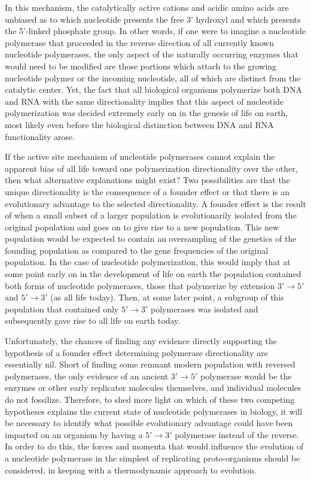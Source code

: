 In this mechanism, the catalytically active cations and acidic amino acids are unbiased as to which nucleotide presents the free 3' hydroxyl and which presents the 5'-linked phosphate group. In other words, if one were to imagine a nucleotide polymerase that proceeded in the reverse direction of all currently known nucleotide polymerases, the only aspect of the naturally occurring enzymes that would need to be modified are those portions which attach to the growing nucleotide polymer or the incoming nucleotide, all of which are distinct from the catalytic center. Yet, the fact that all biological organisms polymerize both DNA and RNA with the same directionality implies that this aspect of nucleotide polymerization was decided extremely early on in the genesis of life on earth, most likely even before the biological distinction between DNA and RNA functionality arose.

If the active site mechanism of nucleotide polymerases cannot explain the apparent bias of all life toward one polymerization directionality over the other, then what alternative explanations might exist? Two possibilities are that the unique directionality is the consequence of a founder effect or that there is an evolutionary advantage to the selected directionality. A founder effect is the result of when a small subset of a larger population is evolutionarily isolated from the original population and goes on to give rise to a new population. This new population would be expected to contain an oversampling of the genetics of the founding population as compared to the gene frequencies of the original population. In the case of nucleotide polymerization, this would imply that at some point early on in the development of life on earth the population contained both forms of nucleotide polymerases, those that polymerize by extension $3'\to5'$ and $5'\to3'$ (as all life today). Then, at some later point, a subgroup of this population that contained only $5'\to3'$ polymerases was isolated and subsequently gave rise to all life on earth today.

Unfortunately, the chances of finding any evidence directly supporting the hypothesis of a founder effect determining polymerase directionality are essentially nil. Short of finding some remnant modern population with reversed polymerases, the only evidence of an ancient $3'\to5'$ polymerase would be the enzymes or other early replicator molecules themselves, and individual molecules do not fossilize. Therefore, to shed more light on which of these two competing hypotheses explains the current state of nucleotide polymerases in biology, it will be necessary to identify what possible evolutionary advantage could have been imparted on an organism by having a $5'\to3'$ polymerase instead of the reverse. In order to do this, the forces and momenta that would influence the evolution of a nucleotide polymerase in the simplest of replicating proto-organisms should be considered, in keeping with a thermodynamic approach to evolution.


